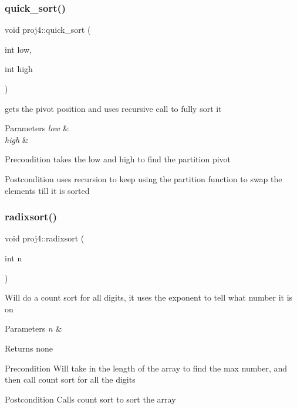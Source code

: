 \subsubsection{\texorpdfstring{quick\+\_\+sort()}{quick\_sort()}}
{\footnotesize\ttfamily void proj4\+::quick\+\_\+sort (\begin{DoxyParamCaption}\item[{int}]{low,  }\item[{int}]{high }\end{DoxyParamCaption})}



gets the pivot position and uses recursive call to fully sort it 


\begin{DoxyParams}{Parameters}
{\em low} & \\
\hline
{\em high} & \\
\hline
\end{DoxyParams}
\begin{DoxyPrecond}{Precondition}
takes the low and high to find the partition pivot 
\end{DoxyPrecond}
\begin{DoxyPostcond}{Postcondition}
uses recursion to keep using the partition function to swap the elements till it is sorted 
\end{DoxyPostcond}
\mbox{\label{classproj4_a612801aac2ccf7f3ed1176a3c2a1d938}} 
\subsubsection{\texorpdfstring{radixsort()}{radixsort()}}
{\footnotesize\ttfamily void proj4\+::radixsort (\begin{DoxyParamCaption}\item[{int}]{n }\end{DoxyParamCaption})}

Will do a count sort for all digits, it uses the exponent to tell what number it is on 
\begin{DoxyParams}{Parameters}
{\em n} & \\
\hline
\end{DoxyParams}
\begin{DoxyReturn}{Returns}
none 
\end{DoxyReturn}
\begin{DoxyPrecond}{Precondition}
Will take in the length of the array to find the max number, and then call count sort for all the digits 
\end{DoxyPrecond}
\begin{DoxyPostcond}{Postcondition}
Calls count sort to sort the array 
\end{DoxyPostcond}
\mbox{\label{classproj4_aa7a82d6f979a7d11fdff535b1329ac79}} 
